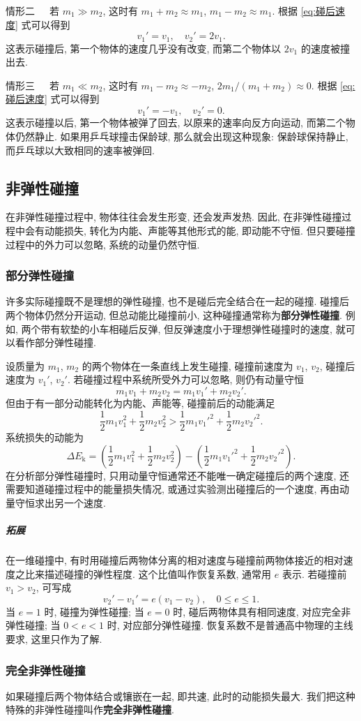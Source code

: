 \documentclass[UTF8,openany,fontset=fandol]{ctexbook}
\theoremstyle{chinesetextbook}
\newcommand{\bre}{\ \ \ }
\begin{document}
{\kaishu 情形二}\bre 若 $m_1\gg m_2$, 这时有 $m_1+m_2\approx m_1$, $m_1-m_2\approx m_1.$ 根据 \eqref{eq:碰后速度} 式可以得到
\[
v_1'=v_1,\quad v_2'=2v_1.
\]
这表示碰撞后, 第一个物体的速度几乎没有改变, 而第二个物体以 $2v_1$ 的速度被撞出去.

{\kaishu 情形三}\bre 若 $m_1\ll m_2$, 这时有 $m_1-m_2\approx-m_2$, $2m_1/(m_1+m_2)\approx 0.$ 根据 \eqref{eq:碰后速度} 式可以得到
\[
v_1'=-v_1,\quad v_2'=0.
\]
这表示碰撞以后, 第一个物体被弹了回去, 以原来的速率向反方向运动, 而第二个物体仍然静止. 如果用乒乓球撞击保龄球, 那么就会出现这种现象: 保龄球保持静止, 而乒乓球以大致相同的速率被弹回.
\subsection{非弹性碰撞}
在非弹性碰撞过程中, 物体往往会发生形变, 还会发声发热. 因此, 在非弹性碰撞过程中会有动能损失, 转化为内能、声能等其他形式的能, 即动能不守恒. 但只要碰撞过程中的外力可以忽略, 系统的动量仍然守恒.
\subsubsection{部分弹性碰撞}
许多实际碰撞既不是理想的弹性碰撞, 也不是碰后完全结合在一起的碰撞. 碰撞后两个物体仍然分开运动, 但总动能比碰撞前小, 这种碰撞通常称为\textbf{部分弹性碰撞}. 例如, 两个带有软垫的小车相碰后反弹, 但反弹速度小于理想弹性碰撞时的速度, 就可以看作部分弹性碰撞.

设质量为 $m_1$, $m_2$ 的两个物体在一条直线上发生碰撞, 碰撞前速度为 $v_1$, $v_2$, 碰撞后速度为 $v_1'$, $v_2'$. 若碰撞过程中系统所受外力可以忽略, 则仍有动量守恒
\[
m_1v_1+m_2v_2=m_1v_1'+m_2v_2'.
\]
但由于有一部分动能转化为内能、声能等, 碰撞前后的动能满足
\[
\frac12m_1v_1^2+\frac12m_2v_2^2>\frac12m_1v_1'^2+\frac12m_2v_2'^2.
\]
系统损失的动能为
\[
\Delta E_\mathrm{k}=\left(\frac12m_1v_1^2+\frac12m_2v_2^2\right)-\left(\frac12m_1v_1'^2+\frac12m_2v_2'^2\right).
\]
在分析部分弹性碰撞时, 只用动量守恒通常还不能唯一确定碰撞后的两个速度, 还需要知道碰撞过程中的能量损失情况, 或通过实验测出碰撞后的一个速度, 再由动量守恒求出另一个速度.

\subparagraph{拓展} 在一维碰撞中, 有时用碰撞后两物体分离的相对速度与碰撞前两物体接近的相对速度之比来描述碰撞的弹性程度. 这个比值叫作恢复系数, 通常用 $e$ 表示. 若碰撞前 $v_1>v_2$, 可写成
\[
v_2'-v_1'=e(v_1-v_2),\quad0\leq e\leq 1.
\]
当 $e=1$ 时, 碰撞为弹性碰撞; 当 $e=0$ 时, 碰后两物体具有相同速度, 对应完全非弹性碰撞; 当 $0<e<1$ 时, 对应部分弹性碰撞. 恢复系数不是普通高中物理的主线要求, 这里只作为了解.
\subsubsection{完全非弹性碰撞}
如果碰撞后两个物体结合或镶嵌在一起, 即共速, 此时的动能损失最大. 我们把这种特殊的非弹性碰撞叫作\textbf{完全非弹性碰撞}.
\end{document}
